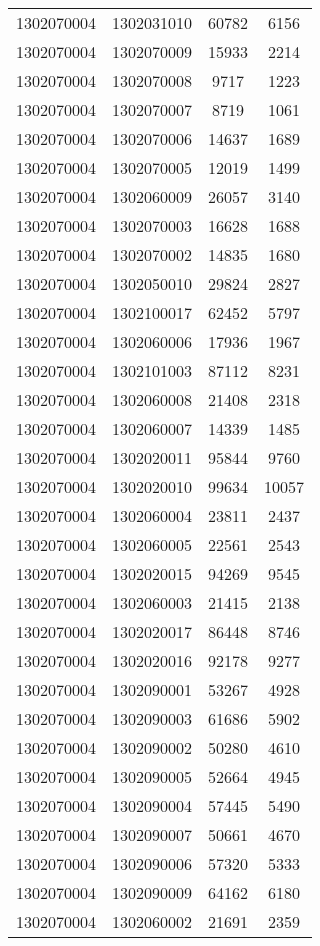 \begin{longtable}[h]{llcc}
		1302070004 & 1302031010 & 60782 & 6156\\
		1302070004 & 1302070009 & 15933 & 2214\\
		1302070004 & 1302070008 & 9717 & 1223\\
		1302070004 & 1302070007 & 8719 & 1061\\
		1302070004 & 1302070006 & 14637 & 1689\\
		1302070004 & 1302070005 & 12019 & 1499\\
		1302070004 & 1302060009 & 26057 & 3140\\
		1302070004 & 1302070003 & 16628 & 1688\\
		1302070004 & 1302070002 & 14835 & 1680\\
		1302070004 & 1302050010 & 29824 & 2827\\
		1302070004 & 1302100017 & 62452 & 5797\\
		1302070004 & 1302060006 & 17936 & 1967\\
		1302070004 & 1302101003 & 87112 & 8231\\
		1302070004 & 1302060008 & 21408 & 2318\\
		1302070004 & 1302060007 & 14339 & 1485\\
		1302070004 & 1302020011 & 95844 & 9760\\
		1302070004 & 1302020010 & 99634 & 10057\\
		1302070004 & 1302060004 & 23811 & 2437\\
		1302070004 & 1302060005 & 22561 & 2543\\
		1302070004 & 1302020015 & 94269 & 9545\\
		1302070004 & 1302060003 & 21415 & 2138\\
		1302070004 & 1302020017 & 86448 & 8746\\
		1302070004 & 1302020016 & 92178 & 9277\\
		1302070004 & 1302090001 & 53267 & 4928\\
		1302070004 & 1302090003 & 61686 & 5902\\
		1302070004 & 1302090002 & 50280 & 4610\\
		1302070004 & 1302090005 & 52664 & 4945\\
		1302070004 & 1302090004 & 57445 & 5490\\
		1302070004 & 1302090007 & 50661 & 4670\\
		1302070004 & 1302090006 & 57320 & 5333\\
		1302070004 & 1302090009 & 64162 & 6180\\
		1302070004 & 1302060002 & 21691 & 2359\\

\end{longtable}
